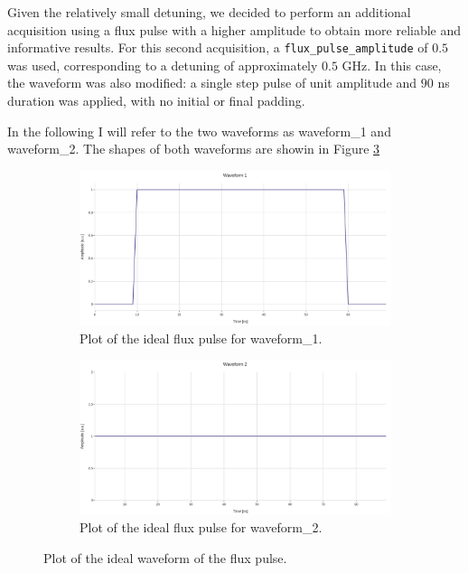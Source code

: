 Given the relatively small detuning, we decided to perform an additional acquisition using a flux pulse with a higher amplitude to obtain more reliable and informative results.
For this second acquisition, a \texttt{flux\_pulse\_amplitude} of $0.5$ was used, corresponding to a detuning of approximately $0.5$ GHz. 
In this case, the waveform was also modified: a single step pulse of unit amplitude and $90$ ns duration was applied, with no initial or final padding.

In the following I will refer to the two waveforms as waveform\_1 and waveform\_2. 
The shapes of both waveforms are showin in Figure \ref{fig:ideal_waveform}

\begin{figure}[h!]
    \centering    
    \begin{subfigure}[t]{0.45\textwidth}
        \includegraphics[width=\textwidth]{figures/png/Cryoscope/waveform1.png}
        \caption{Plot of the ideal flux pulse for waveform\_1.}
        \label{fig:waveform1}
    \end{subfigure}
    \hfill
    \begin{subfigure}[t]{0.45\textwidth}
        \includegraphics[width=\textwidth]{figures/png/Cryoscope/waveform2.png}
        \caption{Plot of the ideal flux pulse for waveform\_2.}
        \label{fig:waveform2}
    \end{subfigure}

    \caption{Plot of the ideal waveform of the flux pulse.}
    \label{fig:ideal_waveform}
\end{figure}

